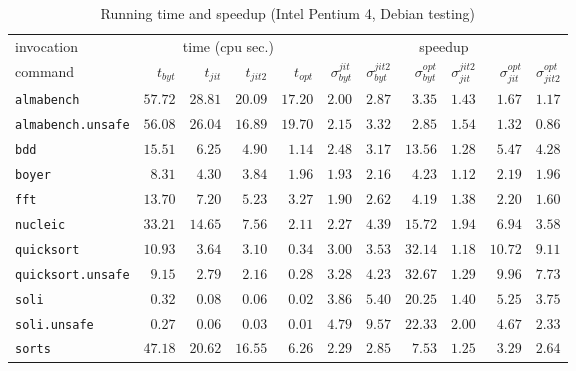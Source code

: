 \documentclass[12pt,a4paper,final]{article}
\begin{document}
\begin{table*}[p]
  \footnotesize
  \centering
  \begin{tabular}{l|rrrr|rrrrrr}
    \multicolumn{1}{l|}{\large invocation}
    & \multicolumn{4}{c|}{{\large time} (cpu sec.)}
    & \multicolumn{6}{c}{\large speedup}
    \\
    command
    & $t_{byt}$ & $t_{jit}$ & $t_{jit2}$ & $t_{opt}$
    & $\sigma^{jit}_{byt}$ & $\sigma^{jit2}_{byt}$ & $\sigma^{opt}_{byt}$
    & $\sigma^{jit2}_{jit}$ & $\sigma^{opt}_{jit}$ & $\sigma^{opt}_{jit2}$
    \\
    \hline
    \texttt{almabench} & $57.72$ & $28.81$ & $20.09$ & $17.20$ & $2.00$ & $2.87$ & $3.35$ & $1.43$ & $1.67$ & $1.17$\\
    \texttt{almabench.unsafe} & $56.08$ & $26.04$ & $16.89$ & $19.70$ & $2.15$ & $3.32$ & $2.85$ & $1.54$ & $1.32$ & $0.86$\\
    \texttt{bdd} & $15.51$ & $6.25$ & $4.90$ & $1.14$ & $2.48$ & $3.17$ & $13.56$ & $1.28$ & $5.47$ & $4.28$\\
    \texttt{boyer} & $8.31$ & $4.30$ & $3.84$ & $1.96$ & $1.93$ & $2.16$ & $4.23$ & $1.12$ & $2.19$ & $1.96$\\
    \texttt{fft} & $13.70$ & $7.20$ & $5.23$ & $3.27$ & $1.90$ & $2.62$ & $4.19$ & $1.38$ & $2.20$ & $1.60$\\
    \texttt{nucleic} & $33.21$ & $14.65$ & $7.56$ & $2.11$ & $2.27$ & $4.39$ & $15.72$ & $1.94$ & $6.94$ & $3.58$\\
    \texttt{quicksort} & $10.93$ & $3.64$ & $3.10$ & $0.34$ & $3.00$ & $3.53$ & $32.14$ & $1.18$ & $10.72$ & $9.11$\\
    \texttt{quicksort.unsafe} & $9.15$ & $2.79$ & $2.16$ & $0.28$ & $3.28$ & $4.23$ & $32.67$ & $1.29$ & $9.96$ & $7.73$\\
    \texttt{soli} & $0.32$ & $0.08$ & $0.06$ & $0.02$ & $3.86$ & $5.40$ & $20.25$ & $1.40$ & $5.25$ & $3.75$\\
    \texttt{soli.unsafe} & $0.27$ & $0.06$ & $0.03$ & $0.01$ & $4.79$ & $9.57$ & $22.33$ & $2.00$ & $4.67$ & $2.33$\\
    \texttt{sorts} & $47.18$ & $20.62$ & $16.55$ & $6.26$ & $2.29$ & $2.85$ & $7.53$ & $1.25$ & $3.29$ & $2.64$\\
  \end{tabular}
  \caption{Running time and speedup (Intel Pentium 4, Debian testing)}
  \label{table:Running_time_and_speedup_Intel_Pentium_4}
\end{table*}
\end{document}
